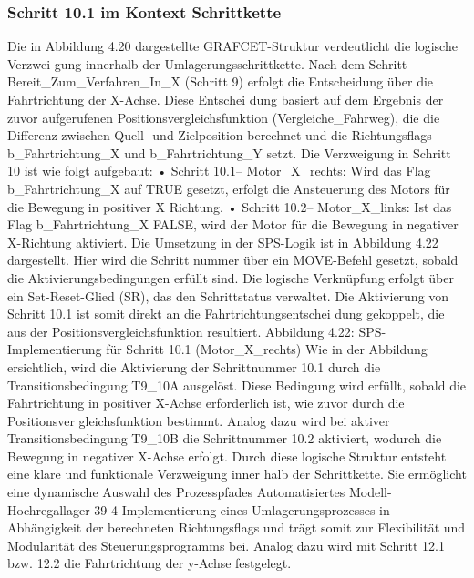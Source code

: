 \subsubsection{Schritt 10.1 im Kontext Schrittkette}
Die in Abbildung 4.20 dargestellte GRAFCET-Struktur verdeutlicht die logische Verzwei
gung innerhalb der Umlagerungsschrittkette. Nach dem Schritt Bereit_Zum_Verfahren_In_X
(Schritt 9) erfolgt die Entscheidung über die Fahrtrichtung der X-Achse. Diese Entschei
dung basiert auf dem Ergebnis der zuvor aufgerufenen Positionsvergleichsfunktion
(Vergleiche_Fahrweg), die die Differenz zwischen Quell- und Zielposition berechnet
und die Richtungsflags b_Fahrtrichtung_X und b_Fahrtrichtung_Y setzt.
Die Verzweigung in Schritt 10 ist wie folgt aufgebaut:
• Schritt 10.1– Motor_X_rechts: Wird das Flag b_Fahrtrichtung_X auf TRUE
gesetzt, erfolgt die Ansteuerung des Motors für die Bewegung in positiver X
Richtung.
• Schritt 10.2– Motor_X_links: Ist das Flag b_Fahrtrichtung_X FALSE, wird der
Motor für die Bewegung in negativer X-Richtung aktiviert.
Die Umsetzung in der SPS-Logik ist in Abbildung 4.22 dargestellt. Hier wird die Schritt
nummer über ein MOVE-Befehl gesetzt, sobald die Aktivierungsbedingungen erfüllt sind.
Die logische Verknüpfung erfolgt über ein Set-Reset-Glied (SR), das den Schrittstatus
verwaltet. Die Aktivierung von Schritt 10.1 ist somit direkt an die Fahrtrichtungsentschei
dung gekoppelt, die aus der Positionsvergleichsfunktion resultiert.
Abbildung 4.22: SPS-Implementierung für Schritt 10.1 (Motor_X_rechts)
Wie in der Abbildung ersichtlich, wird die Aktivierung der Schrittnummer 10.1 durch
die Transitionsbedingung T9_10A ausgelöst. Diese Bedingung wird erfüllt, sobald die
Fahrtrichtung in positiver X-Achse erforderlich ist, wie zuvor durch die Positionsver
gleichsfunktion bestimmt. Analog dazu wird bei aktiver Transitionsbedingung T9_10B die
Schrittnummer 10.2 aktiviert, wodurch die Bewegung in negativer X-Achse erfolgt.
Durch diese logische Struktur entsteht eine klare und funktionale Verzweigung inner
halb der Schrittkette. Sie ermöglicht eine dynamische Auswahl des Prozesspfades
Automatisiertes Modell- Hochregallager
39
4 Implementierung eines Umlagerungsprozesses
in Abhängigkeit der berechneten Richtungsflags und trägt somit zur Flexibilität und
Modularität des Steuerungsprogramms bei. Analog dazu wird mit Schritt 12.1 bzw. 12.2
die Fahrtrichtung der y-Achse festgelegt.


